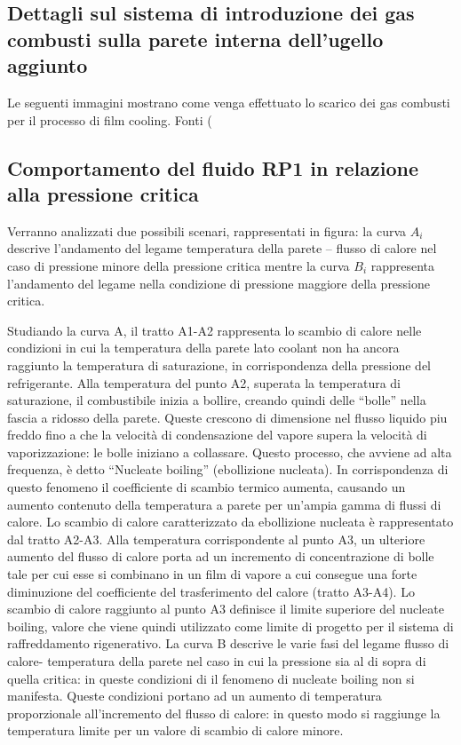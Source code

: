 \subsection{Dettagli sul sistema di introduzione dei gas combusti sulla parete interna dell'ugello aggiunto}
Le seguenti immagini mostrano come venga effettuato lo scarico dei gas combusti per il processo di film cooling. Fonti (\cite{site_exhaust} \cite{f-1_manual}

\subsection{Comportamento del fluido RP1 in relazione alla pressione critica}

 
Verranno analizzati due possibili scenari, rappresentati in figura: la curva $A_i$ descrive l'andamento del legame temperatura della parete – flusso di calore nel caso di pressione minore della pressione critica mentre la curva $B_i$ rappresenta l'andamento del legame nella condizione di pressione maggiore della pressione critica.

Studiando la curva A, il tratto A1-A2 rappresenta lo scambio di calore nelle condizioni in cui la temperatura della parete lato coolant non ha ancora raggiunto la temperatura di saturazione, in corrispondenza della pressione del refrigerante. Alla temperatura del punto A2, superata la temperatura di saturazione, il combustibile inizia a bollire, creando quindi delle “bolle” nella fascia a ridosso della parete. Queste crescono di dimensione nel flusso liquido piu freddo fino a che la velocità di condensazione del vapore supera la velocità di vaporizzazione: le bolle iniziano a collassare. Questo processo, che avviene ad alta frequenza, è detto “Nucleate boiling” (ebollizione nucleata). In corrispondenza di questo fenomeno il coefficiente di scambio termico aumenta, causando un aumento contenuto della temperatura a parete per un'ampia gamma di flussi di calore. Lo scambio di calore caratterizzato da ebollizione nucleata è rappresentato dal tratto A2-A3. Alla temperatura corrispondente al punto A3, un ulteriore aumento del flusso di calore porta ad un incremento di concentrazione di bolle tale per cui esse si combinano in un film di vapore a cui consegue una forte diminuzione del coefficiente del trasferimento del calore (tratto A3-A4). Lo scambio di calore raggiunto al punto A3 definisce il limite superiore del nucleate boiling, valore che viene quindi utilizzato come limite di progetto per il sistema di raffreddamento rigenerativo.
La curva B descrive le varie fasi del legame flusso di calore- temperatura della parete nel caso in cui la pressione sia al di sopra di quella critica: in queste condizioni di il fenomeno di nucleate boiling non si manifesta. Queste condizioni portano ad un aumento di temperatura proporzionale all'incremento del flusso di calore: in questo modo si raggiunge la temperatura limite per un valore di scambio di calore minore.

 
